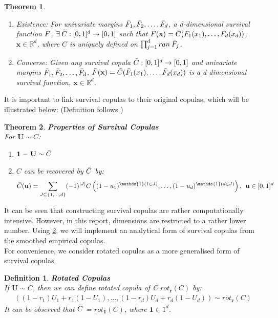 \documentclass[12pt]{report}
\newtheorem{theorem}{Theorem}[subsection]
\newtheorem{definition}{Definition}[subsection]
\newcommand{\1}{\mathbf{1}}
\begin{document}
\begin{flushleft}
\begin{theorem}
\begin{enumerate}
\item Existence: For univariate margins $\Bar{F}_{1}, \Bar{F}_{2}, \dots, \Bar{F}_{d}$, a d-dimensional survival function $\Bar{F}$, $\exists \: \Bar{C}: [0,1]^{d} \rightarrow [0,1]$ such that $\Bar{F}(\textbf{x}) = \Bar{C}(\Bar{F}_{1}(x_{1}), \dots, \Bar{F}_{d}(x_{d}))$, $\textbf{x} \in \mathbb{R}^{d}$, where $C$ is uniquely defined on $\prod_{j=1}^{d} ran \: \Bar{F}_{j}$.
\item Converse: Given any survival copula $\Bar{C}: [0,1]^{d} \rightarrow [0,1]$ and univariate margins $\Bar{F}_{1}, \Bar{F}_{2}, \dots, \Bar{F}_{d}$, $\Bar{F}(\textbf{x}) = \Bar{C}(\Bar{F}_{1}(x_{1}), \dots, \Bar{F}_{d}(x_{d}))$ is a d-dimensional survival function, $\textbf{x} \in \mathbb{R}^{d}$.
\end{enumerate}
\end{theorem}

It is important to link survival copulas to their original copulas, which will be illustrated below: (Definition follows \cite{HofertBook})

\begin{theorem}\label{SurvivalCopulaProperties}
\textit{\normalfont\parencite{HofertBook}}
\:\textbf{Properties of Survival Copulas} \\
For $\textbf{U} \sim C$:
\begin{enumerate}
\item $\textbf{1 -- U} \sim \Bar{C}$
\item $C$ can be recovered by $\Bar{C}$ by:
\begin{align*}
\Bar{C}(\textbf{u}) = \sum\limits_{J \subseteq \{1, \dots, d \} }(-1)^{|J|}C \left( (1 - u_{1})^{\mathds{1}(1\in J)}, \dots, (1 - u_{d})^{\mathds{1}(d\in J)} \right), \: \: \textbf{u} \in [0,1]^{d}
\end{align*}
\end{enumerate}
\end{theorem}

It can be seen that constructing survival copulas are rather computationally intensive. However, in this report, dimensions are restricted to a rather lower number. Using \ref{SurvivalCopulaProperties}, we will implement an analytical form of survival copulas from the smoothed empirical copulas.\\
\vspace{0.5cm}
For convenience, we consider rotated copulas as a more generalised form of survival copulas.

\begin{definition}\label{RotatedCopulaProperties}
\textit{\normalfont\parencite{HofertBook}}
\:\textbf{Rotated Copulas} \\
If $\textbf{U} \sim C$, then we can define rotated copula of C $rot_{\textbf{r}}(C)$ by:
\begin{align*}
\left( (1 - r_{1})U_{1} + r_{1}(1 - U_{1}), \dots, (1 - r_{d})U_{d} + r_{d}(1 - U_{d}) \right) \sim rot_{\textbf{r}}(C)
\end{align*}
It can be observed that $\Bar{C}$ = $rot_{\textbf{1}}(C)$, where $\textbf{1} \in 1^{d}$.
\end{definition}


\end{flushleft}
\end{document}
